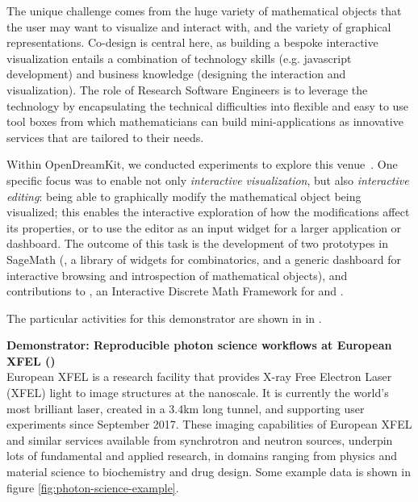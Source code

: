   The unique challenge comes from the huge variety of mathematical
  objects that the user may want to visualize and interact with, and
  the variety of graphical representations. Co-design is central here,
  as building a bespoke interactive visualization entails a
  combination of technology skills (e.g. javascript development) and
  business knowledge (designing the interaction and visualization).
  The role of Research Software Engineers is to leverage the
  technology by encapsulating the technical difficulties into flexible
  and easy to use tool boxes from which mathematicians can build
  mini-applications as innovative services that are tailored to their needs.

  Within OpenDreamKit, we conducted experiments to explore this
  venue~\cite{ODK_D4.16}. One specific focus was to enable not only
  \emph{interactive visualization}, but also \emph{interactive
    editing}: being able to graphically modify the mathematical object
  being visualized; this enables the interactive exploration of how the
  modifications affect its properties, or to use the editor as an input
  widget for a larger application or dashboard. The outcome of this
  task is the development of two prototypes in SageMath
  (, a library of widgets for
  combinatorics, and  a generic dashboard for
  interactive browsing and introspection of mathematical objects), and
  contributions to , an Interactive Discrete Math
  Framework for  and .

  The particular activities for this demonstrator are shown in
   in .

\medskip
\noindent\textbf{Demonstrator: Reproducible photon science workflows at
  European XFEL ()}\label{sec:concept-demonstrator-photonscience}\\


  European XFEL is a research facility that provides X-ray Free
  Electron Laser (XFEL) light to image structures at the nanoscale. It
  is currently the world's most brilliant laser, created in a 3.4km
  long tunnel, and supporting user experiments since September
  2017. These imaging capabilities of European XFEL and similar
  services available from synchrotron and neutron sources, underpin lots of
  fundamental and applied research, in domains ranging from
  physics and material science to biochemistry and drug design. Some
  example data is shown in figure \ref{fig:photon-science-example}.

